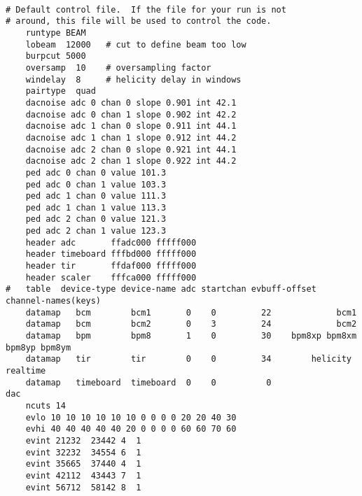 \begin{slide*}

\centerline{}

\tiny

\begin{verbatim}

# Default control file.  If the file for your run is not
# around, this file will be used to control the code.
    runtype BEAM      
    lobeam  12000   # cut to define beam too low 
    burpcut 5000    
    oversamp  10    # oversampling factor
    windelay  8     # helicity delay in windows
    pairtype  quad  
    dacnoise adc 0 chan 0 slope 0.901 int 42.1  
    dacnoise adc 0 chan 1 slope 0.902 int 42.2  
    dacnoise adc 1 chan 0 slope 0.911 int 44.1  
    dacnoise adc 1 chan 1 slope 0.912 int 44.2  
    dacnoise adc 2 chan 0 slope 0.921 int 44.1  
    dacnoise adc 2 chan 1 slope 0.922 int 44.2  
    ped adc 0 chan 0 value 101.3
    ped adc 0 chan 1 value 103.3
    ped adc 1 chan 0 value 111.3
    ped adc 1 chan 1 value 113.3
    ped adc 2 chan 0 value 121.3
    ped adc 2 chan 1 value 123.3
    header adc       ffadc000 fffff000    
    header timeboard fffbd000 fffff000   
    header tir       ffdaf000 fffff000    
    header scaler    fffca000 fffff000  
#   table  device-type device-name adc startchan evbuff-offset channel-names(keys)
    datamap   bcm        bcm1       0    0         22             bcm1
    datamap   bcm        bcm2       0    3         24             bcm2
    datamap   bpm        bpm8       1    0         30    bpm8xp bpm8xm bpm8yp bpm8ym
    datamap   tir        tir        0    0         34        helicity realtime 
    datamap   timeboard  timeboard  0    0          0               dac
    ncuts 14        
    evlo 10 10 10 10 10 10 0 0 0 0 20 20 40 30
    evhi 40 40 40 40 40 20 0 0 0 0 60 60 70 60
    evint 21232  23442 4  1
    evint 32232  34554 6  1
    evint 35665  37440 4  1
    evint 42112  43443 7  1
    evint 56712  58142 8  1

\end{verbatim}


\end{slide*}

\begin{slide*}

\centerline{}

\begin{figure}[htbp]
\begin{center}
\end{center}
\end{figure} 

\end{slide*}


